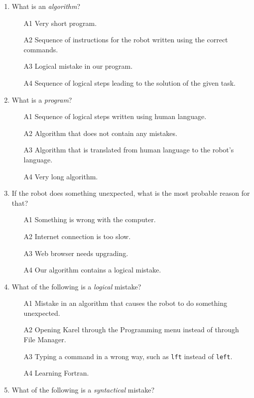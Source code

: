 \documentclass[article,A4,12pt]{llncs}
\begin{document}
{{\begin{enumerate}
\item What is an {\em algorithm}?
\begin{enumerate}
\item[A1] Very short program.
\item[A2] Sequence of instructions for the robot written using the correct commands.
\item[A3] Logical mistake in our program.
\item[A4] Sequence of logical steps leading to the solution of the given task.
\end{enumerate}
\item What is a {\em program}?
\begin{enumerate}
\item[A1] Sequence of logical steps written using human language.
\item[A2] Algorithm that does not contain any mistakes.
\item[A3] Algorithm that is translated from human language to the robot's language.
\item[A4] Very long algorithm.
\end{enumerate}
\item If the robot does something unexpected, what is the most probable reason for that?
\begin{enumerate}
\item[A1] Something is wrong with the computer.
\item[A2] Internet connection is too slow.
\item[A3] Web browser needs upgrading.
\item[A4] Our algorithm contains a logical mistake.
\end{enumerate}
\item What of the following is a {\em logical} mistake?
\begin{enumerate}
\item[A1] Mistake in an algorithm that causes the robot to do something unexpected.
\item[A2] Opening Karel through the Programming menu instead of through File Manager. 
\item[A3] Typing a command in a wrong way, such as {\tt lft} instead of {\tt left}.
\item[A4] Learning Fortran.
\end{enumerate}
\item What of the following is a {\em syntactical} mistake?
\begin{enumerate}

\end{enumerate}
\end{enumerate}}}
\end{document}
